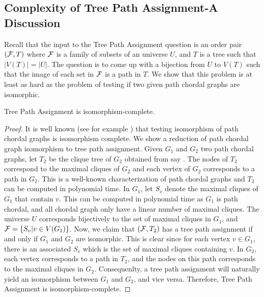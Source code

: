 \documentclass[MS]             %
              {iitmdiss_as}    %
\begin{document}
\subsection{Complexity of Tree Path Assignment-A
  Discussion} 
\label{complexity} 
Recall that the input to the Tree
Path Assignment question is an order pair $({\cal F},T)$ where ${\cal F}$ is a
family of subsets of an universe $U$, and $T$ is a tree such that
$|V(T)| = |U|$.  The question is to come up with a bijection from $U$
to $V(T)$ such that the image of each set in ${\cal F}$ is a path in $T$.
We show that this problem is at least as hard as the problem of
testing if two given path chordal graphs are isomorphic.
\begin{theorem} \label{thm:isocomp} Tree Path Assignment is
  isomorphism-complete.
\end{theorem}
\begin{proof}
  It is well known (see for example \cite{kklv10}) that testing
  isomorphism of path chordal graphs is isomorphism complete.  We show
  a reduction of path chordal graph isomorphism to tree path
  assignment.  Given $G_1$ and $G_2$ two path chordal graphs, let
  $T_2$ be the clique tree of $G_2$ obtained from say \cite{gav78}.
  The nodes of $T_2$ correspond to the maximal cliques of $G_2$ and
  each vertex of $G_2$ corresponds to a path in $G_2$.  This is a
  well-known characterization of path chordal graphs and $T_2$ can be
  computed in polynomial time.  In $G_1$, let $S_v$ denote the maximal
  cliques of $G_1$ that contain $v$.  This can be computed in
  polynomial time as $G_1$ is path chordal, and all chordal graph only
  have a linear number of maximal cliques.  The universe $U$
  corresponds bijectively to the set of maximal cliques in $G_1$, and
  ${\cal F} = \{S_v | v \in V(G_1)\}$.  Now, we claim that $({\cal F}, T_2)$ has
  a tree path assignment if and only if $G_1$ and $G_2$ are
  isomorphic.  This is clear since for each vertex $v \in G_1$, there
  is an associated $S_v$ which is the set of maximal cliques
  containing $v$.  In $G_2$, each vertex corresponds to a path in
  $T_2$, and the nodes on this path corresponds to the maximal cliques
  in $G_2$.  Consequenlty, a tree path assignment will naturally yield
  an isomorphism between $G_1$ and $G_2$, and vice versa.  Therefore,
  Tree Path Assignment is isomorphism-complete.
\end{proof}
\end{document}
